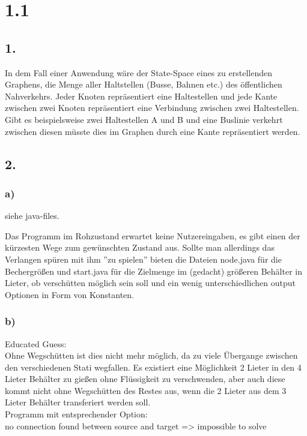 \documentclass[a4paper,11pt,fleqn]{scrartcl}
\title{\titleinfo}
\author{\authorinfo}
\begin{document}
\maketitle

\section*{1.1}
\subsection*{1.}
In dem Fall einer Anwendung wäre der State-Space eines zu erstellenden Graphens, die Menge aller Haltstellen (Busse, Bahnen etc.) des öffentlichen Nahverkehrs. Jeder Knoten repräsentiert eine Haltestellen und jede Kante zwischen zwei Knoten repräsentiert eine Verbindung zwischen zwei Haltestellen. Gibt es beispielsweise zwei Haltestellen A und B und eine Buslinie verkehrt zwischen diesen müsste dies im Graphen durch eine Kante repräsentiert werden.  
\subsection*{2.}
\subsubsection*{a)}
siehe java-files. \\
\begin{small}
Das Programm im Rohzustand erwartet keine Nutzereingaben, es gibt einen der kürzesten Wege zum gewünschten Zustand aus.
Sollte man allerdings das Verlangen spüren mit ihm ''zu spielen'' bieten die Dateien node.java für die Bechergrößen und start.java für die Zielmenge im (gedacht) größeren Behälter in Lieter, ob verschütten möglich sein soll und ein wenig unterschiedlichen output Optionen in Form von Konstanten.
\end{small}

\subsubsection*{b)}
Educated Guess: \\
Ohne Wegschütten ist dies nicht mehr möglich, da zu viele Übergange zwischen den verschiedenen Stati wegfallen. Es existiert eine Möglichkeit 2 Lieter in den 4 Lieter Behälter zu gießen ohne Flüssigkeit zu verschwenden, aber auch diese kommt nicht ohne Wegschütten des Restes aus, wenn die 2 Lieter aus dem 3 Lieter Behälter transferiert werden soll. \\
Programm mit entsprechender Option: \\
no connection found between source and target => impossible to solve
\end{document}
